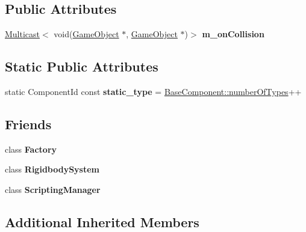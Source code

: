 \subsection*{Public Attributes}
\begin{DoxyCompactItemize}
\item 
\mbox{\label{classRigidbodyComponent_a0e5df88cd54f006fca8de1383a4dd1ad}} 
\hyperlink{classMulticast}{Multicast}$<$ void(\hyperlink{classGameObject}{Game\+Object} $\ast$, \hyperlink{classGameObject}{Game\+Object} $\ast$)$>$ {\bfseries m\+\_\+on\+Collision}
\end{DoxyCompactItemize}
\subsection*{Static Public Attributes}
\begin{DoxyCompactItemize}
\item 
\mbox{\label{classRigidbodyComponent_af221dd26ffa3afa7eddb139cba1821f6}} 
static Component\+Id const {\bfseries static\+\_\+type} = \hyperlink{classBaseComponent_a084ade347bc71a7f0d3b17ecdc2225a4}{Base\+Component\+::number\+Of\+Types}++
\end{DoxyCompactItemize}
\subsection*{Friends}
\begin{DoxyCompactItemize}
\item 
\mbox{\label{classRigidbodyComponent_a328c093d609680cca505905c6d49901a}} 
class {\bfseries Factory}
\item 
\mbox{\label{classRigidbodyComponent_a55a81cc4c29d94c4266e29a2e459bc1e}} 
class {\bfseries Rigidbody\+System}
\item 
\mbox{\label{classRigidbodyComponent_ab3d6fafb2064bace492fd6b503d044f4}} 
class {\bfseries Scripting\+Manager}
\end{DoxyCompactItemize}
\subsection*{Additional Inherited Members}


